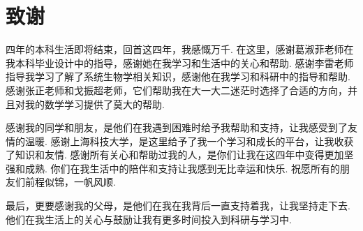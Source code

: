 %
%
%
%
%
%
%
%
%
%
%
%

\chapter[致谢]{致\quad 谢}%
四年的本科生活即将结束，回首这四年，我感慨万千. 在这里，感谢葛淑菲老师在我本科毕业设计中的指导，感谢她在我学习和生活中的关心和帮助. 感谢李雷老师指导我学习了解了系统生物学相关知识，感谢他在我学习和科研中的指导和帮助. 感谢张正老师和戈振超老师，它们帮助我在大一大二迷茫时选择了合适的方向，并且对我的数学学习提供了莫大的帮助. 

感谢我的同学和朋友，是他们在我遇到困难时给予我帮助和支持，让我感受到了友情的温暖. 感谢上海科技大学，是这里给予了我一个学习和成长的平台，让我收获了知识和友情. 感谢所有关心和帮助过我的人，是你们让我在这四年中变得更加坚强和成熟. 你们在我生活中的陪伴和支持让我感到无比幸运和快乐. 祝愿所有的朋友们前程似锦，一帆风顺. 

最后，更要感谢我的父母，是他们在我在我背后一直支持着我，让我坚持走下去. 他们在我生活上的关心与鼓励让我有更多时间投入到科研与学习中. 
\pagestyle{mainmatterstyle} %
\cleardoublepage[plain]%

